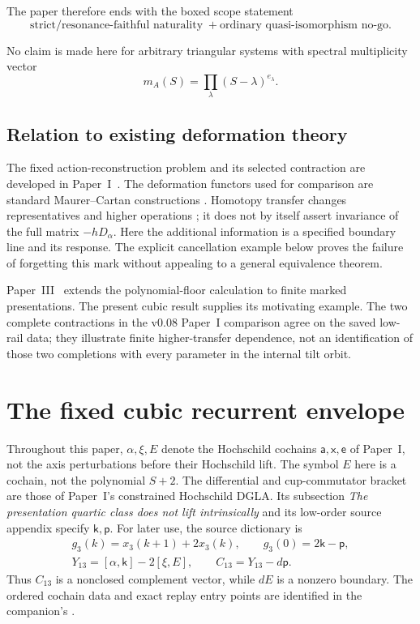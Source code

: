 \documentclass[11pt]{amsart}
\begin{document}
The paper therefore ends with the boxed scope statement
\[
\boxed{\text{strict/resonance-faithful naturality}\;+
       \text{ordinary quasi-isomorphism no-go}.}
\]

No claim is made here for arbitrary triangular systems with spectral multiplicity vector
\[
m_A(S)=\prod_\lambda(S-\lambda)^{e_\lambda}.
\]

\subsection*{Relation to existing deformation theory}
The fixed action-reconstruction problem and its selected contraction are developed
in Paper~I~\cite{PaperI}. The deformation functors used for comparison are standard
Maurer--Cartan constructions \cite{Manetti2005,Getzler2009}. Homotopy transfer changes
representatives and higher operations \cite[Chapter~10]{LodayVallette2012}; it does
not by itself assert invariance of the full matrix $-hD_\alpha$.
Here the additional information is a specified boundary line and its response.
The explicit cancellation example below proves the failure of forgetting this mark
without appealing to a general equivalence theorem.

Paper~III~\cite{PaperIII} extends the polynomial-floor calculation to finite marked
presentations. The present cubic result supplies its motivating example. The two complete
contractions in the v0.08 Paper~I comparison agree on the saved low-rail data;
they illustrate finite higher-transfer dependence, not an identification of
those two completions with every parameter in the internal tilt orbit.

\section{The fixed cubic recurrent envelope}\label{sec:fixed-input}
Throughout this paper, $\alpha,\xi,E$ denote the Hochschild cochains
$\mathsf a,\mathsf x,\mathsf e$ of Paper~I, not the axis perturbations
before their Hochschild lift. The symbol $E$ here is a cochain, not the
polynomial $S+2$. The differential and cup-commutator bracket are those
of Paper~I's constrained Hochschild DGLA.
Its subsection \emph{The presentation quartic class does not lift intrinsically}
and its low-order source appendix specify $\mathsf k,\mathsf p$.
For later use, the source dictionary is
\[
\begin{gathered}
g_3(k)=x_3(k+1)+2x_3(k),\qquad g_3(0)=2\mathsf k-\mathsf p,\\
Y_{13}=[\alpha,\mathsf k]-2[\xi,E],\qquad
C_{13}=Y_{13}-d\mathsf p .
\end{gathered}
\]
Thus $C_{13}$ is a nonclosed complement vector, while $dE$ is a
nonzero boundary. The ordered cochain data and exact replay entry points
are identified in the companion's .
\end{document}
